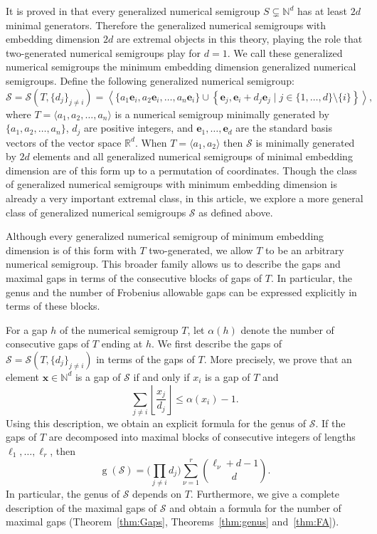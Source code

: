 \documentclass[12pt]{amsart}
\theoremstyle{plain}
\theoremstyle{theorem}
\theoremstyle{remark}
\begin{document}
It is proved in \cite{garcia2018extension} that every generalized numerical semigroup $S \subsetneq \mathbb{N}^d$ has at least $2d$ minimal
generators. Therefore the generalized numerical
semigroups with embedding dimension $2d$
are extremal objects in this theory, playing
the role that two-generated numerical semigroups
play for $d=1$. We call these generalized
numerical semigroups the minimum embedding
dimension generalized numerical semigroups.
Define the following generalized numerical
semigroup:
$$\mathcal{S}=\mathcal{S}(T,\{d_j\}_{j \neq i})
=\left\langle
\{a_1\mathbf{e}_i,a_2\mathbf{e}_i,\ldots,a_n\mathbf{e}_i\}
\cup
\left\{
\mathbf{e}_j, \mathbf{e}_i +d_j\mathbf{e}_j
\mid j\in\{1,\ldots,d\}\setminus \{i\}
\right\}
\right\rangle,$$
where $T=\langle a_1,a_2,\ldots,a_n\rangle$ is a numerical semigroup minimally generated by $\{a_1,a_2,\ldots,a_n\}$, $d_j$ are positive integers, and $\mathbf{e}_1,\ldots,\mathbf{e}_d$ are the standard basis vectors of the vector space $\mathbb{R}^d$. When
$T=\langle a_1,a_2\rangle$
then $\mathcal{S}$ is minimally generated by $2d$ elements
and all generalized numerical semigroups of
minimal embedding dimension are of this
form up to a permutation of coordinates. Though the class of generalized numerical semigroups
with minimum embedding dimension is already
a very important extremal class, in this
article, we explore a more general class
of generalized numerical semigroups $\mathcal{S}$ as defined above.

Although every generalized numerical semigroup of minimum embedding dimension is of this form with \(T\) two-generated, we allow \(T\) to be an arbitrary numerical semigroup. 
This broader family allows us to describe the gaps and maximal gaps in terms of the consecutive blocks of gaps of \(T\). 
In particular, the genus and the number of Frobenius allowable gaps can be expressed explicitly in terms of these blocks.

For a gap $h$ of the numerical semigroup $T$, let $\alpha(h)$ denote the number of consecutive gaps of $T$ ending at $h$. We first describe the gaps of $\mathcal{S}=\mathcal{S}(T,\{d_j\}_{j\neq i})$ in terms of the gaps of $T$. More precisely, we prove that an element $\mathbf{x}\in\mathbb{N}^d$ is a gap of $\mathcal{S}$ if and only if $x_i$ is a gap of $T$ and
$$\sum_{j\neq i}\left\lfloor\frac{x_j}{d_j}\right\rfloor
\leq \alpha(x_i)-1.$$
 Using this description, we obtain an explicit formula for the genus of $\mathcal{S}$. If the gaps of $T$ are decomposed into maximal blocks of consecutive integers of lengths $\ell_1,\ldots,\ell_r$, then
$$\operatorname{g}(\mathcal{S})=\Big(\prod_{j\neq i}d_j\Big)
\sum_{\nu=1}^{r}\binom{\ell_\nu+d-1}{d}.$$
In particular, the genus of $\mathcal{S}$ depends on $T$. Furthermore, we give a complete description of the maximal gaps of $\mathcal{S}$ and obtain a formula for the number of maximal gaps (Theorem~\ref{thm:Gaps}, Theorems~\ref{thm:genus} and~\ref{thm:FA}).
\end{document}
